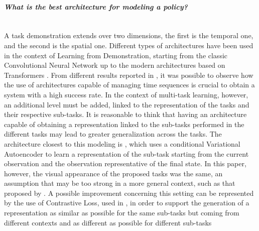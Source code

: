 \paragraph{\textit{What is the best architecture for modeling a policy?}}  \mbox{} \\
A task demonstration extends over two dimensions, the first is the temporal one, and the second is the spatial one. Different types of architectures have been used in the context of Learning from Demonstration, starting from the classic Convolutional Neural Network \cite{zhang2018deep_vr_teleoperation,yu2018daml,yu2018one_shot_hil} up to the modern architectures based on Transformers \cite{dasari2021transformers_one_shot,mandi2022towards_more_generalizable_one_shot}. From different results reported in \cite{mandi2022towards_more_generalizable_one_shot,mandlekar2022matters}, it was possible to observe how the use of architectures capable of managing time sequences is crucial to obtain a system with a high success rate. In the context of multi-task learning, however, an additional level must be added, linked to the representation of the tasks and their respective sub-tasks. It is reasonable to think that having an architecture capable of obtaining a representation linked to the sub-tasks performed in the different tasks may lead to greater generalization across the tasks. The architecture closest to this modeling is \cite{Mandlekar2020GTI}, which uses a conditional Variational Autoencoder to learn a representation of the sub-task starting from the current observation and the observation representative of the final state. In this paper, however, the visual appearance of the proposed tasks was the same, an assumption that may be too strong in a more general context, such as that proposed by \cite{mandi2022towards_more_generalizable_one_shot}. A possible improvement concerning this setting can be represented by the use of Contrastive Loss, used in \cite{sermanet2018time_contrastive,zakka2022xirl}, in order to support the generation of a representation as similar as possible for the same sub-tasks but coming from different contexts and as different as possible for different sub-tasks